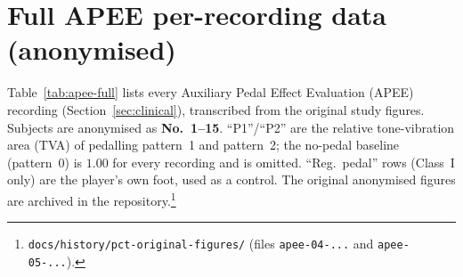 \appendix
\section{Full APEE per-recording data (anonymised)}
\label{app:apee-data}

Table~\ref{tab:apee-full} lists every Auxiliary Pedal Effect Evaluation (APEE)
recording (Section~\ref{sec:clinical}), transcribed from the original study
figures. Subjects are anonymised as \textbf{No.~1--15}. ``P1''/``P2'' are the
relative tone-vibration area (TVA) of pedalling pattern~1 and pattern~2; the
no-pedal baseline (pattern~0) is $1.00$ for every recording and is omitted.
``Reg.\ pedal'' rows (Class~I only) are the player's own foot, used as a control.
The original anonymised figures are archived in the
repository.\footnote{\texttt{docs/history/pct-original-figures/} (files
\texttt{apee-04-...} and \texttt{apee-05-...}).}

